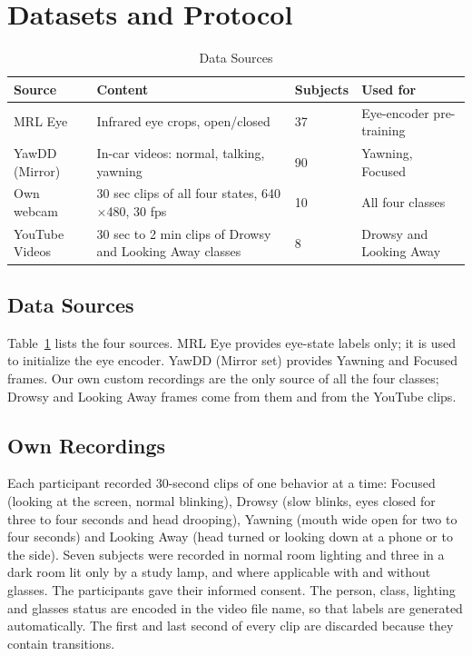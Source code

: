 \documentclass[conference]{IEEEtran}
\begin{document}
\vspace{0.2cm}
\section{Datasets and Protocol}

\begin{table}[t]
\caption{Data Sources}
\label{tab:data_sources}
\centering
\small
\renewcommand{\arraystretch}{1.3}
\begin{tabular}{|p{1.4cm}|p{3.0cm}|p{1.0cm}|p{1.5cm}|}
\hline
Source & Content & Subjects & Used for \\
\hline
MRL Eye &
Infrared eye crops, open/closed &
37 &
Eye-encoder pre-training \\
\hline
YawDD (Mirror) &
In-car videos: normal, talking, yawning &
90 &
Yawning, Focused \\
\hline
Own webcam &
30 sec clips of all four states, 640$\times$480, 30 fps &
10 &
All four classes \\
\hline
YouTube Videos &
30 sec to 2 min clips of Drowsy and Looking Away classes &
8 &
Drowsy and Looking Away\\
\hline
\end{tabular}
\end{table}

\subsection{Data Sources}\label{sec:sources}
Table~\ref{tab:data_sources} lists the four sources. MRL Eye provides eye-state labels only; it is used to initialize the eye encoder. YawDD (Mirror set) provides Yawning and Focused frames. Our own custom recordings are the only source of all the four classes; Drowsy and Looking Away frames come from them and from the YouTube clips.

\subsection{Own Recordings}\label{sec:own}
Each participant recorded 30-second clips of one behavior at a time: Focused (looking at the screen, normal blinking), Drowsy (slow blinks, eyes closed for three to four seconds and head drooping), Yawning (mouth wide open for two to four seconds) and Looking Away (head turned or looking down at a phone or to the side). Seven subjects were recorded in normal room lighting and three in a dark room lit only by a study lamp, and where applicable with and without glasses. The participants gave their informed consent. The person, class, lighting and glasses status are encoded in the video file name, so that labels are generated automatically. The first and last second of every clip are discarded because they contain transitions.
\end{document}
